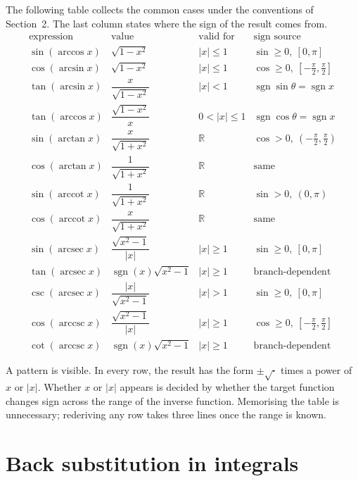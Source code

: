 \documentclass{essay}
\DeclareMathOperator{\arcsec}{arcsec}
\DeclareMathOperator{\arccsc}{arccsc}
\DeclareMathOperator{\arccot}{arccot}
\DeclareMathOperator{\sgn}{sgn}
\begin{document}
The following table collects the common cases under the conventions of
Section~2. The last column states where the sign of the result comes from.
{\small
\renewcommand{\arraystretch}{1.6}
\[
\begin{array}{llll}
\text{expression} & \text{value} & \text{valid for} & \text{sign source} \\
\hline
\sin(\arccos x) & \sqrt{1 - x^2} & |x| \le 1 & \sin \ge 0,\ [0,\pi] \\
\cos(\arcsin x) & \sqrt{1 - x^2} & |x| \le 1 & \cos \ge 0,\ [-\tfrac{\pi}{2},\tfrac{\pi}{2}] \\
\tan(\arcsin x) & \dfrac{x}{\sqrt{1 - x^2}} & |x| < 1 & \sgn\sin\theta = \sgn x \\
\tan(\arccos x) & \dfrac{\sqrt{1 - x^2}}{x} & 0 < |x| \le 1 & \sgn\cos\theta = \sgn x \\
\sin(\arctan x) & \dfrac{x}{\sqrt{1 + x^2}} & \mathbb{R} & \cos > 0,\ (-\tfrac{\pi}{2},\tfrac{\pi}{2}) \\
\cos(\arctan x) & \dfrac{1}{\sqrt{1 + x^2}} & \mathbb{R} & \text{same} \\
\sin(\arccot x) & \dfrac{1}{\sqrt{1 + x^2}} & \mathbb{R} & \sin > 0,\ (0,\pi) \\
\cos(\arccot x) & \dfrac{x}{\sqrt{1 + x^2}} & \mathbb{R} & \text{same} \\
\sin(\arcsec x) & \dfrac{\sqrt{x^2 - 1}}{|x|} & |x| \ge 1 & \sin \ge 0,\ [0,\pi] \\
\tan(\arcsec x) & \sgn(x)\sqrt{x^2 - 1} & |x| \ge 1 & \text{branch-dependent} \\
\csc(\arcsec x) & \dfrac{|x|}{\sqrt{x^2 - 1}} & |x| > 1 & \sin \ge 0,\ [0,\pi] \\
\cos(\arccsc x) & \dfrac{\sqrt{x^2 - 1}}{|x|} & |x| \ge 1 & \cos \ge 0,\ [-\tfrac{\pi}{2},\tfrac{\pi}{2}] \\
\cot(\arccsc x) & \sgn(x)\sqrt{x^2 - 1} & |x| \ge 1 & \text{branch-dependent}
\end{array}
\]
}

A pattern is visible. In every row, the result has the form
$\pm\sqrt{\cdot}$ times a power of $x$ or $|x|$. Whether $x$ or $|x|$
appears is decided by whether the target function changes sign across
the range of the inverse function. Memorising the table is unnecessary;
rederiving any row takes three lines once the range is known.

\section{Back substitution in integrals}
\end{document}
